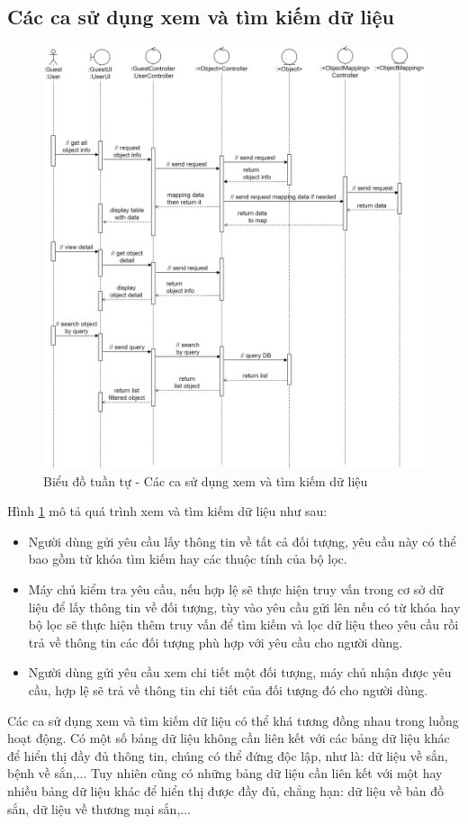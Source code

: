 \documentclass[./../main.tex]{subfiles}
\begin{document}
\subsection{Các ca sử dụng xem và tìm kiếm dữ liệu}
\begin{figure}[H]
	\centering
	\includegraphics[width=\linewidth]{./img/uc6-11.png}
	\caption{\label{tab:seq-uc6}Biểu đồ tuần tự - Các ca sử dụng xem và tìm kiếm dữ liệu}
\end{figure}
Hình \ref{tab:seq-uc6} mô tả quá trình xem và tìm kiếm dữ liệu như sau:
\begin{itemize}
    \item Người dùng gửi yêu cầu lấy thông tin về tất cả đối tượng, yêu cầu này có thể bao gồm từ khóa tìm kiếm hay các thuộc tính của bộ lọc.
    \item Máy chủ kiểm tra yêu cầu, nếu hợp lệ sẽ thực hiện truy vấn trong cơ sở dữ liệu để lấy thông tin về đối tượng, tùy vào yêu cầu gửi lên nếu có từ khóa hay bộ lọc sẽ thực hiện thêm truy vấn để tìm kiếm và lọc dữ liệu theo yêu cầu rồi trả về thông tin các đối tượng phù hợp với yêu cầu cho người dùng.
    \item Người dùng gửi yêu cầu xem chi tiết một đối tượng, máy chủ nhận được yêu cầu, hợp lệ sẽ trả về thông tin chi tiết của đối tượng đó cho người dùng.
\end{itemize}
Các ca sử dụng xem và tìm kiếm dữ liệu có thể khá tương đồng nhau trong luồng hoạt động. Có một số bảng dữ liệu không cần liên kết với các bảng dữ liệu khác để hiển thị đầy đủ thông tin, chúng có thể đứng độc lập, như là: dữ liệu về sắn, bệnh về sắn,... Tuy nhiên cũng có những bảng dữ liệu cần liên kết với một hay nhiều bảng dữ liệu khác để hiển thị được đầy đủ, chẳng hạn: dữ liệu về bản đồ sắn, dữ liệu về thương mại sắn,...
\end{document}
